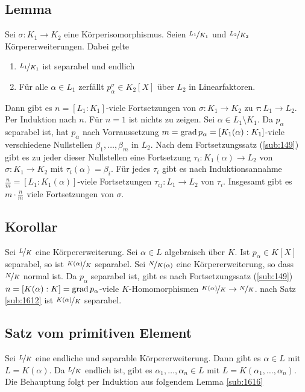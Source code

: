 \subsection[Lemma: Hilfslemma über die Anzahl der Fortsetzungen eines Körperisomorphismus]{Lemma} %
\label{sub:1613}
Sei $\sigma : K_1 \to K_2$ eine Körperisomorphismus. Seien $\nicefrac{L_1}{K_1}$ und $\nicefrac{L_2}{K_2}$ Körpererweiterungen. Dabei gelte
\begin{enumerate}[1)]
	\item $\nicefrac{L_1}{K_1}$ ist separabel und endlich
	\item Für alle $\alpha \in L_1$ zerfällt $p^\sigma_\alpha \in K_2[X]$ über $L_2$ in Linearfaktoren.
\end{enumerate}
Dann gibt es $n=[L_1 :K_1]$-viele Fortsetzungen von $\sigma : K_1 \to K_2$ zu $\tau :L_1 \to L_2$.
Per Induktion nach $n$. Für $n=1$ ist nichts zu zeigen. Sei $\alpha \in L_1 \setminus K_1$. Da $p_\alpha$ separabel ist, hat $p_\alpha$ nach Vorraussetzung 
$m= \operatorname{grad} p_\alpha= [K_1(\alpha):K_1]$-viele verschiedene Nullstellen $\beta_1, \ldots , \beta_m$ in $L_2$. Nach dem Fortsetzungssatz (\ref{sub:149}) gibt es zu jeder
dieser Nullstellen eine Fortsetzung $\tau_i : K_1(\alpha) \to L_2$ von $\sigma : K_1 \to K_2$ mit $\tau_i(\alpha)= \beta_i$. Für jedes $\tau_i$ gibt es nach 
Induktionsannahme $\frac{n}{m}=[L_1:K_1(\alpha)] $-viele Fortsetzungen $\tau_{ij} : L_1 \to L_2$ von $\tau_i$. Insgesamt gibt es $m \cdot \frac{n}{m} $ viele Fortsetzungen 
von $\sigma$. \bewende

\subsection[Korollar: Wenn $p_\alpha$ separabel ist, ist auch $\nicefrac{K(\alpha)}{K}$ separabel]{Korollar} %
\label{sub:1614}
Sei $\nicefrac{L}{K}$ eine Körpererweiterung. Sei $\alpha \in L$ algebraisch über $K$. Ist $p_\alpha \in K[X]$ separabel, so ist $\nicefrac{K(\alpha)}{K}$ separabel.
Sei $\nicefrac{N}{K(\alpha)}$ eine Körpererweiterung, so dass $\nicefrac{N}{K}$ normal ist. Da $p_\alpha$ separabel ist, gibt es nach Fortsetzungssatz (\ref{sub:149})
$n=[K(\alpha):K]= \operatorname{grad} p_\alpha$-viele $K$-Homomorphismen $\nicefrac{K(\alpha)}{K} \to \nicefrac{N}{K}$. nach Satz \ref{sub:1612} ist $\nicefrac{K(\alpha)}{K}$ separabel.
\bewende

\subsection{Satz vom primitiven Element} %
\label{sub:1615}
Sei $\nicefrac{L}{K}$ eine endliche und separable Körpererweiterung. Dann gibt es $\alpha \in L$ mit $L=K(\alpha)$.
Da $\nicefrac{L}{K}$ endlich ist, gibt es $\alpha_1, \ldots , \alpha_n \in L$ mit $L=K(\alpha_1, \ldots , \alpha_n)$. Die Behauptung folgt per Induktion aus folgendem
Lemma \ref{sub:1616} \bewende

